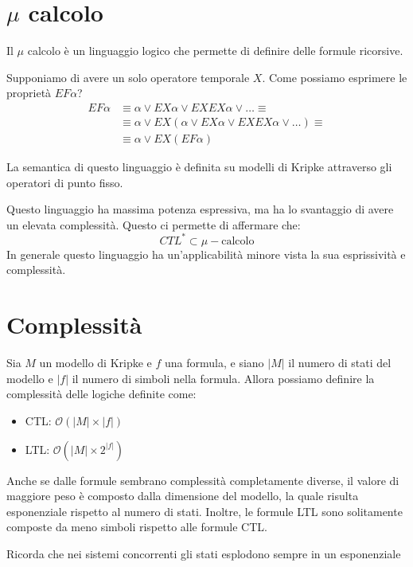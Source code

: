 \section{$\mu$ calcolo}
Il $\mu$ calcolo è un linguaggio logico che permette di definire delle formule
ricorsive.
\begin{esempio}
    Supponiamo di avere un solo operatore temporale $X$. Come possiamo esprimere
    le proprietà $EF \alpha$?
    \begin{equation}
        \begin{array}{ll}
            EF\alpha & \equiv \alpha\lor EX\alpha\lor EXEX\alpha\lor \dots \equiv               \\
                     & \equiv \alpha\lor EX(\alpha\lor EX\alpha\lor EXEX\alpha\lor \dots)\equiv \\
                     & \equiv \alpha \lor EX(EF\alpha)
        \end{array}
    \end{equation}
\end{esempio}
La semantica di questo linguaggio è definita su modelli di Kripke attraverso
gli operatori di punto fisso.

Questo linguaggio ha massima potenza espressiva, ma ha lo svantaggio di avere
un elevata complessità. Questo ci permette di affermare che:
\begin{equation}
    CTL^{\ast} \subset \mu-\text{calcolo}
\end{equation}
In generale questo linguaggio ha un'applicabilità minore vista la sua esprissività
e complessità.

\section{Complessità}
Sia $M$ un modello di Kripke e $f$ una formula, e siano $|M|$ il numero di stati
del modello e $|f|$ il numero di simboli nella formula. Allora possiamo definire
la complessità delle logiche definite come:
\begin{itemize}
    \item CTL: $\mathcal{O}(|M| \times |f|)$
    \item LTL: $\mathcal{O}(|M| \times 2^{|f|})$
\end{itemize}
Anche se dalle formule sembrano complessità completamente diverse, il valore di
maggiore peso è composto dalla dimensione del modello, la quale risulta
esponenziale rispetto al numero di stati. Inoltre, le formule LTL sono solitamente
composte da meno simboli rispetto alle formule CTL.
\begin{nota}
    Ricorda che nei sistemi concorrenti gli stati esplodono sempre in un esponenziale
\end{nota}

